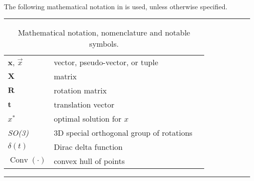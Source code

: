 The following mathematical notation in  is used, unless otherwise specified.

\begin{table*}[!h]
  \scriptsize
  \centering
  \noindent\rule{\textwidth}{0.5pt}
  \begin{tabular}{lll}
    $\mathbf{x}$, $\vec{x}$ & vector, pseudo-vector, or tuple\\
    $\mathbf{X}$ & matrix \\
    $\mathbf{R}$ & rotation matrix \\
    $\mathbf{t}$ & translation vector \\
    $x^{*}$ & optimal solution for $x$ \\
    \emph{SO(3)} & 3D special orthogonal group of rotations\\
    $\delta(t)$ & Dirac delta function \\
    $\operatorname{Conv}(\cdot)$ & convex hull of points \\
  \end{tabular}
  \noindent\rule{\textwidth}{0.5pt}
  \caption{Mathematical notation, nomenclature and notable symbols.}
  \label{tab:mathematical_notation}
\end{table*}

